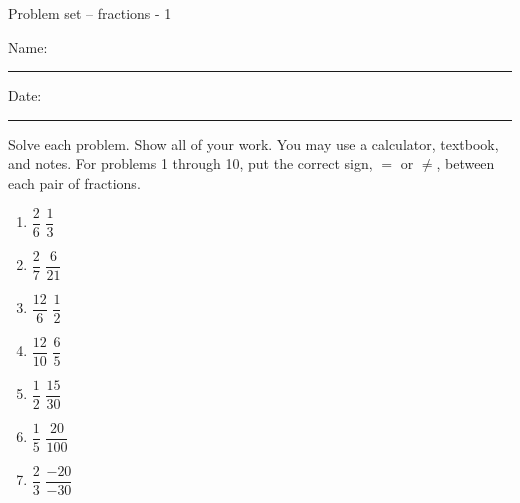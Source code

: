 \documentclass[12pt]{article}
\begin{document}
\pagestyle{empty} %
\begin{center}
          Problem set -- fractions - 1 \\[0.5in]
\end{center}
Name: \rule{4in}{0.005in} Date: \rule{1.5in}{0.005in} 
  \vspace{0.25in}
Solve each problem. Show all of your work. You may use a calculator, textbook, and notes. For problems 1 through 10, put the correct sign, $=$ or $\neq$, between each pair of fractions. 
\begin{multicols}{2}
\begin{enumerate}
\item \hspace{0.50in} $\dfrac{2}{6}$ \hspace{0.50in} $\dfrac{1}{3}$ 
  \vspace{0.25in}

\item \hspace{0.50in} $\dfrac{2}{7}$ \hspace{0.50in} $\dfrac{6}{21}$ 
  \vspace{0.25in}

\item \hspace{0.50in} $\dfrac{12}{6}$ \hspace{0.50in} $\dfrac{1}{2}$ 
  \vspace{0.25in}

\item \hspace{0.50in} $\dfrac{12}{10}$ \hspace{0.50in} $\dfrac{6}{5}$ 
  \vspace{0.25in}

\item \hspace{0.50in} $\dfrac{1}{2}$ \hspace{0.50in} $\dfrac{15}{30}$ 
  \vspace{0.25in}

\item \hspace{0.50in} $\dfrac{1}{5}$ \hspace{0.50in} $\dfrac{20}{100}$ 
  \vspace{0.25in}

\item \hspace{0.50in} $\dfrac{2}{3}$ \hspace{0.50in} $\dfrac{-20}{-30}$ 
  \vspace{0.25in}


\end{enumerate}
\end{multicols}
\end{document}
